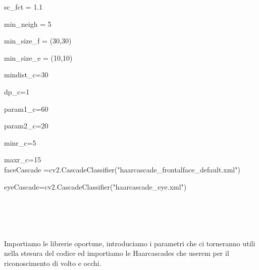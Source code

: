 \documentclass[12pt]{article}
\begin{document}
{{\begin{minipage}[c]{150mm}
		
		\hspace{4ex}	sc\_fct = 1.1       
		    
		\hspace{4ex}	min\_neigh = 5      
		     
		\hspace{4ex}	min\_size\_f = (30,30)  
		   
		\hspace{4ex}	min\_size\_e = (10,10)   
		  
		\hspace{4ex}	mindist\_c=30         
		    
		\hspace{4ex}	dp\_c=1                 
		   
		\hspace{4ex}	param1\_c=60          
		    
		\hspace{4ex}	param2\_c=20          
		   
		\hspace{4ex}	minr\_c=5             
		    
		\hspace{4ex}	maxr\_c=15      \\           
		
			
			
			
		
		\hspace{4ex}	faceCascade =cv2.CascadeClassifier("haarcascade\_frontalface\_default.xml")
		
		\hspace{4ex}	eyeCascade=cv2.CascadeClassifier("haarcascade\_eye.xml")\\
		
		
	\end{minipage}}
	\\
	\\
	\\
	\\
	Importiamo le librerie oportune, introduciamo i parametri che ci torneranno utili nella stesura del codice ed importiamo le Haarcascades che userem per il riconoscimento di volto e occhi.
\pagebreak




}
\end{document}
